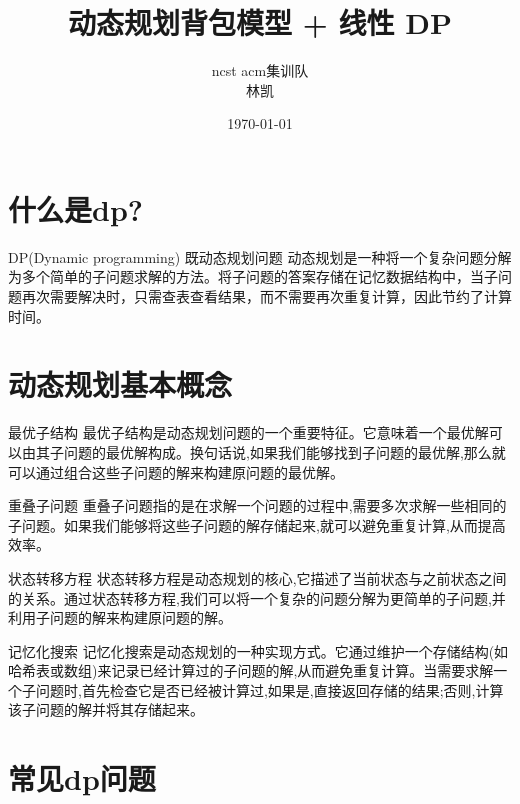 \documentclass{beamer}
\title{动态规划背包模型 + 线性 DP}
\author{ncst acm集训队 \\ 林凯}
\date{\today}
\begin{document}
\frame{\titlepage}

\section{什么是dp?}

\begin{frame}{DP(Dynamic programming) 既动态规划问题}
    动态规划是一种将一个复杂问题分解为多个简单的子问题求解的方法。将子问题的答案存储在记忆数据结构中，当子问题再次需要解决时，只需查表查看结果，而不需要再次重复计算，因此节约了计算时间。
\end{frame}

\section{动态规划基本概念}

\begin{frame}{最优子结构}
    最优子结构是动态规划问题的一个重要特征。它意味着一个最优解可以由其子问题的最优解构成。换句话说,如果我们能够找到子问题的最优解,那么就可以通过组合这些子问题的解来构建原问题的最优解。
\end{frame}

\begin{frame}{重叠子问题}
    重叠子问题指的是在求解一个问题的过程中,需要多次求解一些相同的子问题。如果我们能够将这些子问题的解存储起来,就可以避免重复计算,从而提高效率。
\end{frame}

\begin{frame}{状态转移方程}
    状态转移方程是动态规划的核心,它描述了当前状态与之前状态之间的关系。通过状态转移方程,我们可以将一个复杂的问题分解为更简单的子问题,并利用子问题的解来构建原问题的解。
\end{frame}

\begin{frame}{记忆化搜索}
    记忆化搜索是动态规划的一种实现方式。它通过维护一个存储结构(如哈希表或数组)来记录已经计算过的子问题的解,从而避免重复计算。当需要求解一个子问题时,首先检查它是否已经被计算过,如果是,直接返回存储的结果;否则,计算该子问题的解并将其存储起来。
\end{frame}

\section{常见dp问题}
\end{document}
